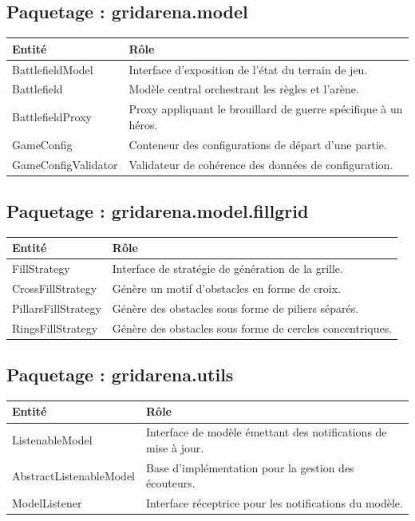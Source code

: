 \documentclass[12pt, a4paper]{article}
\begin{document}
\subsection{Paquetage : gridarena.model}
\begin{tabular}{|p{7cm}|p{8cm}|}
\hline
\textbf{Entité} & \textbf{Rôle} \\ \hline
BattlefieldModel & Interface d'exposition de l'état du terrain de jeu. \\ \hline
Battlefield & Modèle central orchestrant les règles et l'arène. \\ \hline
BattlefieldProxy & Proxy appliquant le brouillard de guerre spécifique à un héros. \\ \hline
GameConfig & Conteneur des configurations de départ d'une partie. \\ \hline
GameConfigValidator & Validateur de cohérence des données de configuration. \\ \hline
\end{tabular}

\subsection{Paquetage : gridarena.model.fillgrid}
\begin{tabular}{|p{7cm}|p{8cm}|}
\hline
\textbf{Entité} & \textbf{Rôle} \\ \hline
FillStrategy & Interface de stratégie de génération de la grille. \\ \hline
CrossFillStrategy & Génère un motif d'obstacles en forme de croix. \\ \hline
PillarsFillStrategy & Génère des obstacles sous forme de piliers séparés. \\ \hline
RingsFillStrategy & Génère des obstacles sous forme de cercles concentriques. \\ \hline
\end{tabular}

\subsection{Paquetage : gridarena.utils}
\begin{tabular}{|p{7cm}|p{8cm}|}
\hline
\textbf{Entité} & \textbf{Rôle} \\ \hline
ListenableModel & Interface de modèle émettant des notifications de mise à jour. \\ \hline
AbstractListenableModel & Base d'implémentation pour la gestion des écouteurs. \\ \hline
ModelListener & Interface réceptrice pour les notifications du modèle. \\ \hline
\end{tabular}
\end{document}
